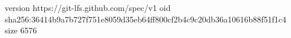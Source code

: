 version https://git-lfs.github.com/spec/v1
oid sha256:36414b9a7b727f751e8059d35eb64ff800cf2b4c9c20db36a10616b88f51f1c4
size 6576
